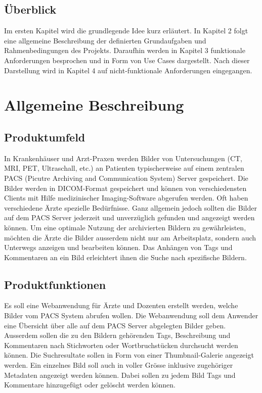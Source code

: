 \subsection{Überblick}
Im ersten Kapitel wird die grundlegende Idee kurz erläutert. In Kapitel 2 folgt eine allgemeine Beschreibung der definierten Grundaufgaben und Rahmenbedingungen des Projekts. Daraufhin werden in Kapitel 3 funktionale Anforderungen besprochen und in Form von Use Cases dargestellt. Nach dieser Darstellung wird in Kapitel 4 auf nicht-funktionale Anforderungen eingegangen.

	\section{Allgemeine Beschreibung}

\subsection{Produktumfeld}
In Krankenhäuser und Arzt-Praxen werden Bilder von Untersuchungen (CT, MRI, PET, Ultraschall, etc.) an Patienten typischerweise auf einem zentralen PACS (Picutre Archiving and Communication System) Server gespeichert. Die Bilder werden in DICOM-Format gespeichert und können von verschiedensten Clients mit Hilfe medizinischer Imaging-Software abgerufen werden. Oft haben verschiedene Ärzte spezielle Bedürfnisse. Ganz allgemein jedoch sollten die Bilder auf dem PACS Server jederzeit und unverzüglich gefunden und angezeigt werden können. Um eine optimale Nutzung der archivierten Bildern zu gewährleisten, möchten die Ärzte die Bilder ausserdem nicht nur am Arbeitsplatz, sondern auch Unterwegs anzeigen und bearbeiten können. Das Anhängen von Tags und Kommentaren an ein Bild erleichtert ihnen die Suche nach spezifische Bildern.

\subsection{Produktfunktionen}
Es soll eine Webanwendung für Ärzte und Dozenten erstellt werden, welche Bilder vom PACS System abrufen wollen. 
Die Webanwendung soll dem Anwender eine Übersicht über alle auf dem PACS Server abgelegten Bilder geben. Ausserdem sollen die zu den Bildern gehörenden Tags, Beschreibung und Kommentaren nach Stichworten oder Wortbruchstücken durchsucht werden können. Die Suchresultate sollen in Form von einer Thumbnail-Galerie angezeigt werden. Ein einzelnes Bild soll auch in voller Grösse inklusive zugehöriger Metadaten angezeigt werden können. Dabei sollen zu jedem Bild Tags und Kommentare hinzugefügt oder gelöscht werden können.

